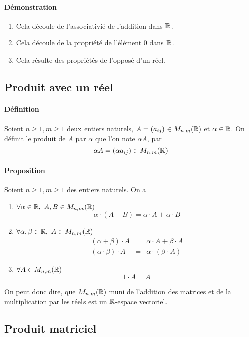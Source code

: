 \paragraph{Démonstration}
\begin{enumerate}
  \item Cela découle de l'associativié de l'addition dans $\mathbb{R}$.
  \item Cela découle de la propriété de l'élément $0$ dans $\mathbb{R}$.
  \item Cela résulte des propriétés de l'opposé d'un réel.
\end{enumerate}

%
\subsection{Produit avec un réel}
%
\paragraph{Définition} Soient $n \geq 1, m \geq 1$ deux entiers naturels, $A = (a_{ij}) \in M_{n, m}(\mathbb{R})$ et $\alpha \in \mathbb{R}$. On  définit le produit de $A$ par $\alpha$ que l'on note $\alpha A$, par
$$\alpha A = (\alpha a_{ij}) \in M_{n, m}(\mathbb{R})$$

\paragraph{Proposition} Soient $n \geq 1, m \geq 1$ des entiers naturels. On a
\begin{enumerate}
  \item $\forall \alpha \in \mathbb{R}, ~ A, B \in M_{n, m}(\mathbb{R})$ 
    $$\alpha \cdot (A + B) = \alpha \cdot A + \alpha \cdot B$$
    
  \item $\forall \alpha, \beta \in \mathbb{R}, ~ A \in M_{n, m}(\mathbb{R})$
    \begin{eqnarray*}
      (\alpha + \beta) \cdot A &=& \alpha \cdot A + \beta \cdot A \\
      (\alpha \cdot \beta) \cdot A &=& \alpha \cdot (\beta \cdot A)
    \end{eqnarray*}
    
  \item $\forall A \in M_{n, m}(\mathbb{R})$
    $$1 \cdot A = A$$
\end{enumerate}
On peut donc dire, que $M_{n, m}(\mathbb{R})$ muni de l'addition des matrices et de la multiplication par les réels est un $\mathbb{R}$-espace vectoriel.

%
\subsection{Produit matriciel}
%
